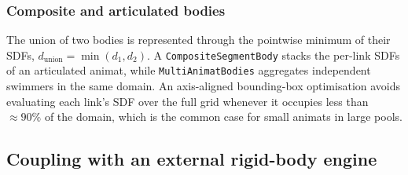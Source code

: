 \documentclass[journal,twoside,10pt]{IEEEtran}
\begin{document}
\subsubsection{Composite and articulated bodies}
The union of two bodies is represented through the pointwise minimum
of their SDFs, $d_\mathrm{union}=\min(d_1,d_2)$.  A
\texttt{CompositeSegmentBody} stacks the per-link SDFs of an
articulated animat, while \texttt{MultiAnimatBodies} aggregates
independent swimmers in the same domain.  An axis-aligned
bounding-box optimisation avoids evaluating each link's SDF over the
full grid whenever it occupies less than $\approx 90\%$ of the
domain, which is the common case for small animats in large pools.


\subsection{Coupling with an external rigid-body engine}\label{sec:coupling}
\end{document}
